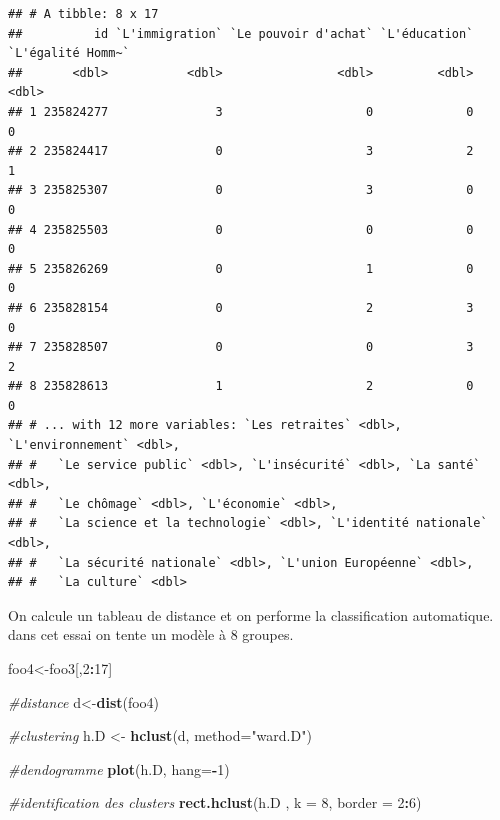 \documentclass[
]{book}
\newenvironment{Shaded}{\begin{snugshade}}{\end{snugshade}}
\newcommand{\CommentTok}[1]{\textcolor[rgb]{0.56,0.35,0.01}{\textit{#1}}}
\newcommand{\DataTypeTok}[1]{\textcolor[rgb]{0.13,0.29,0.53}{#1}}
\newcommand{\DecValTok}[1]{\textcolor[rgb]{0.00,0.00,0.81}{#1}}
\newcommand{\KeywordTok}[1]{\textcolor[rgb]{0.13,0.29,0.53}{\textbf{#1}}}
\newcommand{\NormalTok}[1]{#1}
\newcommand{\OperatorTok}[1]{\textcolor[rgb]{0.81,0.36,0.00}{\textbf{#1}}}
\newcommand{\StringTok}[1]{\textcolor[rgb]{0.31,0.60,0.02}{#1}}
\begin{document}
\begin{verbatim}
## # A tibble: 8 x 17
##          id `L'immigration` `Le pouvoir d'achat` `L'éducation` `L'égalité Homm~`
##       <dbl>           <dbl>                <dbl>         <dbl>             <dbl>
## 1 235824277               3                    0             0                 0
## 2 235824417               0                    3             2                 1
## 3 235825307               0                    3             0                 0
## 4 235825503               0                    0             0                 0
## 5 235826269               0                    1             0                 0
## 6 235828154               0                    2             3                 0
## 7 235828507               0                    0             3                 2
## 8 235828613               1                    2             0                 0
## # ... with 12 more variables: `Les retraites` <dbl>, `L'environnement` <dbl>,
## #   `Le service public` <dbl>, `L'insécurité` <dbl>, `La santé` <dbl>,
## #   `Le chômage` <dbl>, `L'économie` <dbl>,
## #   `La science et la technologie` <dbl>, `L'identité nationale` <dbl>,
## #   `La sécurité nationale` <dbl>, `L'union Européenne` <dbl>,
## #   `La culture` <dbl>
\end{verbatim}

On calcule un tableau de distance et on performe la classification automatique. dans cet essai on tente un modèle à 8 groupes.

\begin{Shaded}
\begin{Highlighting}[]
\NormalTok{foo4<-foo3[,}\DecValTok{2}\OperatorTok{:}\DecValTok{17}\NormalTok{]}

\CommentTok{#distance}
\NormalTok{d<-}\KeywordTok{dist}\NormalTok{(foo4)}

\CommentTok{#clustering}
\NormalTok{h.D  <-}\StringTok{ }\KeywordTok{hclust}\NormalTok{(d, }\DataTypeTok{method=}\StringTok{"ward.D"}\NormalTok{)}

\CommentTok{#dendogramme}
\KeywordTok{plot}\NormalTok{(h.D,  }\DataTypeTok{hang=}\OperatorTok{-}\DecValTok{1}\NormalTok{)}

\CommentTok{#identification des clusters}
\KeywordTok{rect.hclust}\NormalTok{(h.D , }\DataTypeTok{k =} \DecValTok{8}\NormalTok{, }\DataTypeTok{border =} \DecValTok{2}\OperatorTok{:}\DecValTok{6}\NormalTok{)}
\end{Highlighting}
\end{Shaded}
\end{document}
